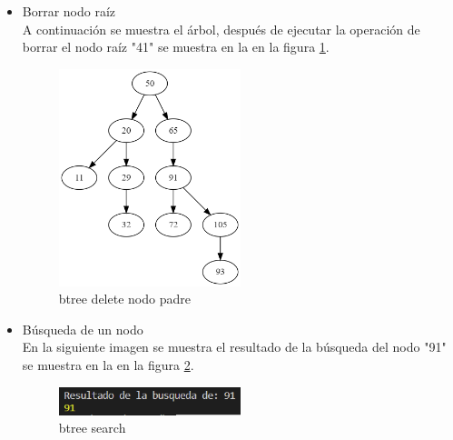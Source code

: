\documentclass{article}
\begin{document}
\begin{itemize}
            \item Borrar nodo raíz \\
            A continuación se muestra el árbol, después de ejecutar la operación de borrar el nodo raíz "41" se muestra en la en la figura \ref{fig:btree_delete_nodo_raiz}.
               \begin{figure}[htbp]
              \centering
              \includegraphics[width=0.5\textwidth]{img/btree_delete_nodo_raiz.png}
              \caption{btree delete nodo padre}
              \label{fig:btree_delete_nodo_raiz}
            \end{figure}  
            \item Búsqueda de un nodo \\
                En la siguiente imagen se muestra el resultado de la búsqueda del nodo "91" se muestra en la en la figura \ref{fig:btree_search}.
         \begin{figure}[htbp]
              \centering
              \includegraphics[width=0.5\textwidth]{img/btree_search.png}
              \caption{btree search}
              \label{fig:btree_search}
            \end{figure} 
           

\end{itemize}
\end{document}
